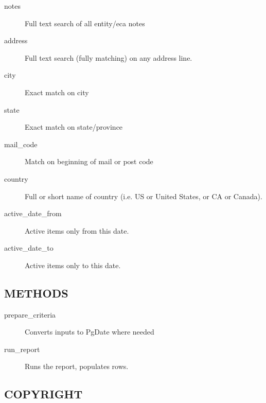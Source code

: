 \begin{description}
\begin{description}
\begin{description}
\begin{description}
\begin{description}
\begin{description}
\begin{description}
\begin{description}
\begin{description}
\begin{description}
\begin{description}
\item[{notes}] \mbox{}

Full text search of all entity/eca notes


\item[{address}] \mbox{}

Full text search (fully matching) on any address line.


\item[{city}] \mbox{}

Exact match on city


\item[{state}] \mbox{}

Exact match on state/province


\item[{mail\_code}] \mbox{}

Match on beginning of mail or post code


\item[{country}] \mbox{}

Full or short name of country (i.e. US or United States, or CA or Canada).


\item[{active\_date\_from}] \mbox{}

Active items only from this date.


\item[{active\_date\_to}] \mbox{}

Active items only to this date.

\end{description}
\subsection*{METHODS\label{LedgerSMB::DBObject::Report::Contact::Search_METHODS}}
\begin{description}

\item[{prepare\_criteria}] \mbox{}

Converts inputs to PgDate where needed


\item[{run\_report}] \mbox{}

Runs the report, populates rows.

\end{description}
\subsection*{COPYRIGHT\label{LedgerSMB::DBObject::Report::Contact::Search_COPYRIGHT}}



\end{description}
\end{description}
\end{description}
\end{description}
\end{description}
\end{description}
\end{description}
\end{description}
\end{description}
\end{description}
